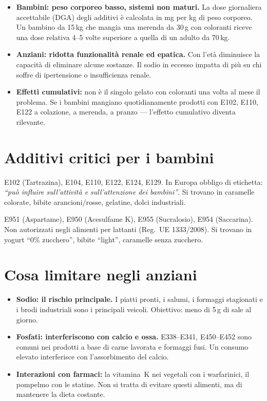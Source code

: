 \documentclass[a5paper,12pt,oneside,openany]{book}
\newcommand{\boxgiallo}[2]{%
  \begin{tcolorbox}[boxbase,
    colback=giallo!12!white, colframe=giallo!80!black, title={#1}]
  #2\end{tcolorbox}}
\newcommand{\boxrosso}[2]{%
  \begin{tcolorbox}[boxbase,
    colback=rosso!8!white, colframe=rosso, title={#1}]
  #2\end{tcolorbox}}
\begin{document}
\begin{itemize}
  \item \textbf{Bambini: peso corporeo basso, sistemi non maturi.} La dose
    giornaliera accettabile (DGA) degli additivi è calcolata in mg per kg
    di peso corporeo. Un bambino da 15\,kg che mangia una merenda da 30\,g
    con coloranti riceve una dose relativa 4--5 volte superiore a quella
    di un adulto da 70\,kg.
  \item \textbf{Anziani: ridotta funzionalità renale ed epatica.} Con
    l'età diminuisce la capacità di eliminare alcune sostanze. Il sodio
    in eccesso impatta di più su chi soffre di ipertensione o
    insufficienza renale.
  \item \textbf{Effetti cumulativi:} non è il singolo gelato con coloranti
    una volta al mese il problema. Se i bambini mangiano quotidianamente
    prodotti con E102, E110, E122 a colazione, a merenda, a pranzo ---
    l'effetto cumulativo diventa rilevante.
\end{itemize}

\section{Additivi critici per i bambini}

\boxrosso{Coloranti azoici --- da evitare con i bambini}{E102 (Tartrazina),
E104, E110, E122, E124, E129. In Europa obbligo di etichetta: \emph{``può
influire sull'attività e sull'attenzione dei bambini''}. Si trovano in
caramelle colorate, bibite arancioni/rosse, gelatine, dolci industriali.}

\boxgiallo{Dolcificanti intensivi --- non approvati per bambini piccoli}{E951
(Aspartame), E950 (Acesulfame K), E955 (Sucralosio), E954 (Saccarina).
Non autorizzati negli alimenti per lattanti (Reg.\ UE 1333/2008). Si
trovano in yogurt ``0\% zucchero'', bibite ``light'', caramelle senza
zucchero.}

\section{Cosa limitare negli anziani}

\begin{itemize}
  \item \textbf{Sodio: il rischio principale.} I piatti pronti, i salumi,
    i formaggi stagionati e i brodi industriali sono i principali veicoli.
    Obiettivo: meno di 5\,g di sale al giorno.
  \item \textbf{Fosfati: interferiscono con calcio e ossa.} E338--E341,
    E450--E452 sono comuni nei prodotti a base di carne lavorata e
    formaggi fusi. Un consumo elevato interferisce con l'assorbimento del
    calcio.
  \item \textbf{Interazioni con farmaci:} la vitamina~K nei vegetali con
    i warfarinici, il pompelmo con le statine. Non si tratta di evitare
    questi alimenti, ma di mantenere la dieta costante.
\end{itemize}
\end{document}
